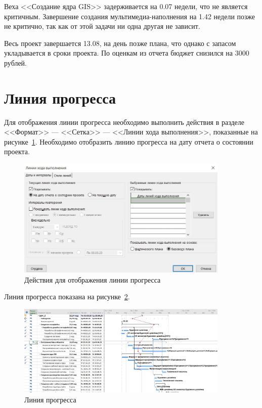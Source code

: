 Веха <<Создание ядра GIS>> задерживается на 0.07 недели, что не является критичным.
Завершение создания мультимедиа-наполнения на 1.42 недели позже не критично, так как от этой задачи ни одна другая не зависит.

Весь проект завершается 13.08, на день позже плана, что однако с запасом укладывается в сроки проекта.
По оценкам из отчета бюджет снизился на 3000 рублей.

\section{Линия прогресса}

Для отображения линии прогресса необходимо выполнить действия в разделе <<Формат>> --- <<Сетка>> --- <<Линии хода выполнения>>, показанные на рисунке~\ref{fig:screen29}.
Необходимо отобразить линию прогресса на дату отчета о состоянии проекта.

\begin{figure}[H]
	\centering
	\includegraphics[width=0.9\textwidth]{img/screen29.jpg}
	\caption{Действия для отображения линии прогресса}
	\label{fig:screen29}
\end{figure}

Линия прогресса показана на рисунке~\ref{fig:screen30}.

\begin{figure}[H]
	\centering
	\includegraphics[width=0.9\textwidth]{img/screen30.jpg}
	\caption{Линия прогресса}
	\label{fig:screen30}
\end{figure}

